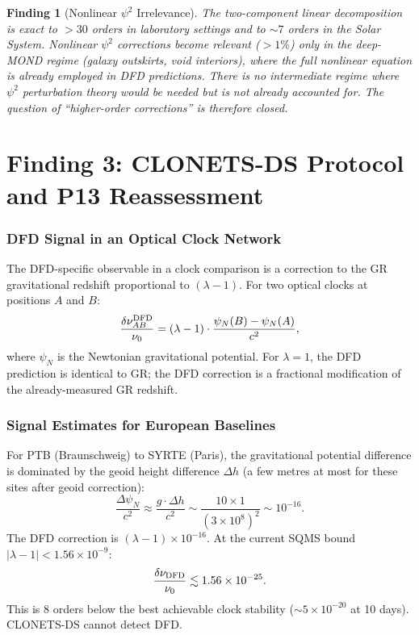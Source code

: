 \documentclass[11pt]{article}
\newtheorem{finding}{Finding}
\newcommand{\ee}[1]{\times 10^{#1}}
\begin{document}
\begin{finding}[Nonlinear $\psi^2$ Irrelevance]\label{find:nonlinear}
The two-component linear decomposition is exact to $>30$ orders in
laboratory settings and to $\sim 7$ orders in the Solar System. Nonlinear
$\psi^2$ corrections become relevant ($>1\%$) only in the deep-MOND
regime (galaxy outskirts, void interiors), where the full nonlinear
equation is already employed in DFD predictions. There is no intermediate
regime where $\psi^2$ perturbation theory would be needed but is not
already accounted for. The question of ``higher-order corrections''
is therefore closed.
\end{finding}


\part{Finding 3: CLONETS-DS Protocol and P13 Reassessment}
\label{part:CLONETS}

\section{DFD Signal in an Optical Clock Network}

The DFD-specific observable in a clock comparison is a correction to
the GR gravitational redshift proportional to $(\lambda - 1)$.
For two optical clocks at positions $A$ and $B$:
\begin{equation}
\frac{\delta\nu_{AB}^{\rm DFD}}{\nu_0} = (\lambda - 1) \cdot
\frac{\psi_N(B) - \psi_N(A)}{c^2},
\end{equation}
where $\psi_N$ is the Newtonian gravitational potential. For $\lambda = 1$,
the DFD prediction is identical to GR; the DFD correction is a fractional
modification of the already-measured GR redshift.

\section{Signal Estimates for European Baselines}

For PTB (Braunschweig) to SYRTE (Paris), the gravitational potential
difference is dominated by the geoid height difference $\Delta h$
(a few metres at most for these sites after geoid correction):
\begin{equation}
\frac{\Delta\psi_N}{c^2} \approx \frac{g \cdot \Delta h}{c^2}
\sim \frac{10 \times 1}{(3\ee{8})^2} \sim 10^{-16}.
\end{equation}
The DFD correction is $(\lambda - 1) \times 10^{-16}$. At the current
SQMS bound $|\lambda - 1| < 1.56\ee{-9}$:
\begin{equation}
\frac{\delta\nu_{\rm DFD}}{\nu_0} \lesssim 1.56\ee{-25}.
\end{equation}
This is 8 orders below the best achievable clock stability
($\sim 5\ee{-20}$ at 10 days). CLONETS-DS cannot detect DFD.
\end{document}
